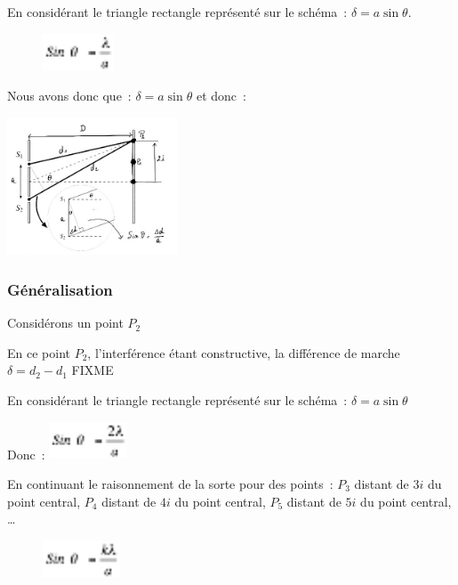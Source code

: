 En considérant le triangle rectangle représenté sur le schéma~:
$\delta = a \sin \theta$.

\begin{figure}
\centering
\includegraphics[width=2.095cm,height=1.107cm]{Pictures/100000010000002800000015DDF3AE193165C3E3.png}
\caption{}
\end{figure}

Nous avons donc que~: $\delta = a \sin \theta$ et donc~:

\includegraphics[width=5.061cm,height=4.096cm]{Pictures/10000001000001D80000017E98931F1CF545D918.png}

\subsubsection{Généralisation}

Considérons un point $P_{2}$

En ce point $P_{2}$, l'interférence étant constructive, la
différence de marche $\delta = d_{2} - d_1$ FIXME

En considérant le triangle rectangle représenté sur le schéma~: $\delta = a \sin \theta$

Donc~:
\includegraphics[width=2.306cm,height=1.107cm]{Pictures/100000010000002C000000153ADDDC592928E9B8.png}

En continuant le raisonnement de la sorte pour des points~:
$P_{3}$ distant de $3i$ du point central,
$P_{4}$ distant de $4i$ du point central,
$P_{5}$ distant de $5i$ du point central, \ldots{}

\begin{figure}
\centering
\includegraphics[width=2.306cm,height=1.107cm]{Pictures/100000010000002C0000001558E0CCA95D4F59EB.png}
\caption{}
\end{figure}

